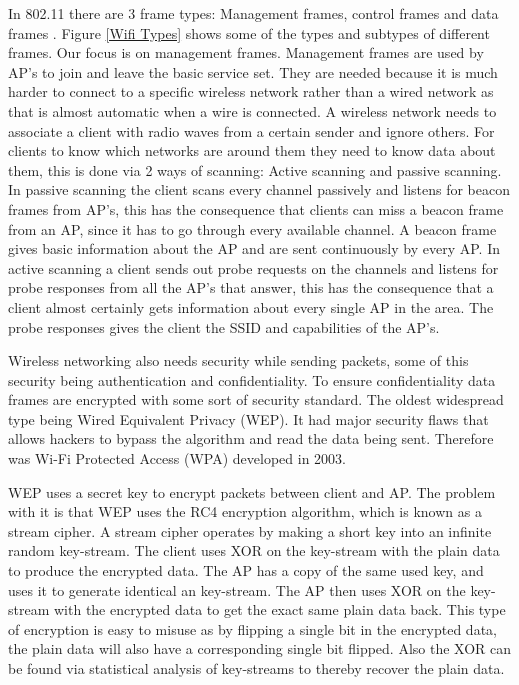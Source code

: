 In 802.11 there are 3 frame types: Management frames, control frames and data frames \cite{Amit802.11frames, DefinitiveGast}. Figure \ref{Wifi Types} shows some of the types and subtypes of different frames. Our focus is on management frames.  Management frames are used by AP's to join and leave the basic service set. They are needed because it is much harder to connect to a specific wireless network rather than a wired network as that is almost automatic when a wire is connected. A wireless network needs to associate a client with radio waves from a certain sender and ignore others. For clients to know which networks are around them they need to know data about them, this is done via 2 ways of scanning: Active scanning and passive scanning. In passive scanning the client scans every channel passively and listens for beacon frames from AP's, this has the consequence that clients can miss a beacon frame from an AP, since it has to go through every available channel. A beacon frame gives basic information about the AP and are sent continuously by every AP. In active scanning a client sends out probe requests on the channels and listens for probe responses from all the AP's that answer, this has the consequence that a client almost certainly gets information about every single AP in the area. The probe responses gives the client the SSID and capabilities of the AP's. 

Wireless networking also needs security while sending packets, some of this security being authentication and confidentiality. To ensure confidentiality data frames are encrypted with some sort of security standard. The oldest widespread type being Wired Equivalent Privacy (WEP). It had major security flaws that allows hackers to bypass the algorithm and read the data being sent\cite{WEP1}. Therefore was Wi-Fi Protected Access (WPA) developed in 2003. 

WEP uses a secret key to encrypt packets between client and AP\cite{WEP2}. The problem with it is that WEP uses the RC4 encryption algorithm, which is known as a stream cipher. A stream cipher operates by making a short key into an infinite random key-stream. The client uses XOR on the key-stream with the plain data to produce the encrypted data. The AP has a copy of the same used key, and uses it to generate identical an key-stream. The AP then uses XOR on the key-stream with the encrypted data to get the exact same plain data back. This type of encryption is easy to misuse as by flipping a single bit in the encrypted data, the plain data will also have a corresponding single bit flipped. Also the XOR can be found via statistical analysis of key-streams to thereby recover the plain data.

